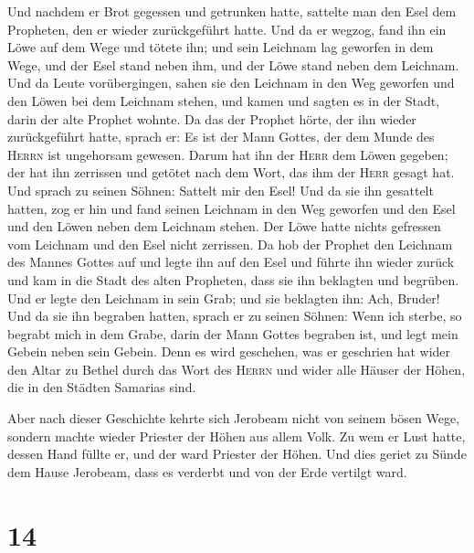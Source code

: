  Und nachdem er Brot gegessen und getrunken hatte,
sattelte man den Esel dem Propheten, den er wieder zurückgeführt hatte.
 Und da er wegzog, fand ihn ein Löwe auf dem Wege und
tötete ihn; und sein Leichnam lag geworfen in dem Wege, und der Esel
stand neben ihm, und der Löwe stand neben dem Leichnam. 
Und da Leute vorübergingen, sahen sie den Leichnam in den Weg geworfen
und den Löwen bei dem Leichnam stehen, und kamen und sagten es in der
Stadt, darin der alte Prophet wohnte.  Da das der Prophet
hörte, der ihn wieder zurückgeführt hatte, sprach er: Es ist der Mann
Gottes, der dem Munde des \textsc{Herrn} ist ungehorsam gewesen. Darum
hat ihn der \textsc{Herr} dem Löwen gegeben; der hat ihn zerrissen und
getötet nach dem Wort, das ihm der \textsc{Herr} gesagt hat.
 Und sprach zu seinen Söhnen: Sattelt mir den Esel! Und
da sie ihn gesattelt hatten,  zog er hin und fand seinen
Leichnam in den Weg geworfen und den Esel und den Löwen neben dem
Leichnam stehen. Der Löwe hatte nichts gefressen vom Leichnam und den
Esel nicht zerrissen.  Da hob der Prophet den Leichnam
des Mannes Gottes auf und legte ihn auf den Esel und führte ihn wieder
zurück und kam in die Stadt des alten Propheten, dass sie ihn beklagten
und begrüben.  Und er legte den Leichnam in sein Grab;
und sie beklagten ihn: Ach, Bruder!  Und da sie ihn
begraben hatten, sprach er zu seinen Söhnen: Wenn ich sterbe, so begrabt
mich in dem Grabe, darin der Mann Gottes begraben ist, und legt mein
Gebein neben sein Gebein.  Denn es wird geschehen, was er
geschrien hat wider den Altar zu Bethel durch das Wort des
\textsc{Herrn} und wider alle Häuser der Höhen, die in den Städten
Samarias sind.

 Aber nach dieser Geschichte kehrte sich Jerobeam nicht
von seinem bösen Wege, sondern machte wieder Priester der Höhen aus
allem Volk. Zu wem er Lust hatte, dessen Hand füllte er, und der ward
Priester der Höhen.  Und dies geriet zu Sünde dem Hause
Jerobeam, dass es verderbt und von der Erde vertilgt ward.

\hypertarget{section-13}{%
\section{14}\label{section-13}}

